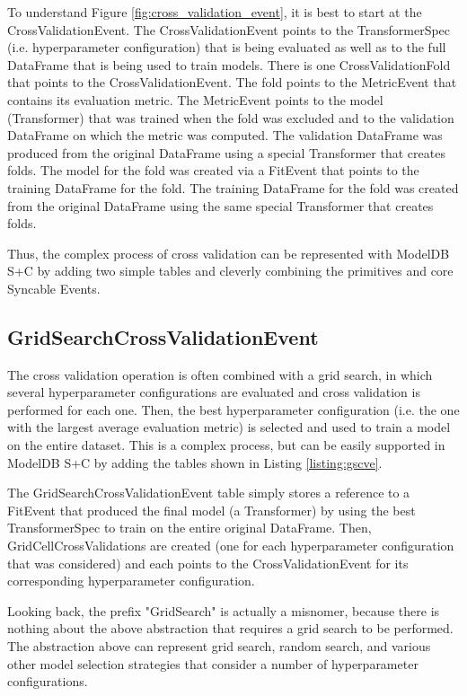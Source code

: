 To understand Figure \ref{fig:cross_validation_event}, it is best to start at the CrossValidationEvent.
The CrossValidationEvent points to the TransformerSpec (i.e. hyperparameter configuration) that is being evaluated
as well as to the full DataFrame that is being used to train models. There is one CrossValidationFold that points to the
CrossValidationEvent. The fold points to the MetricEvent that contains its evaluation metric. The MetricEvent
points to the model (Transformer) that was trained when the fold was excluded and to the validation DataFrame
on which the metric was computed. The validation DataFrame was produced from the original DataFrame using a special
Transformer that creates folds. The model for the fold was created via a FitEvent that points to the training DataFrame
for the fold. The training DataFrame for the fold was created from the original DataFrame using the same special Transformer that
creates folds.

Thus, the complex process of cross validation can be represented with ModelDB S+C by adding two simple tables and cleverly
combining the primitives and core Syncable Events.

\subsection{GridSearchCrossValidationEvent}
The cross validation operation is often combined with a grid search, in which several hyperparameter configurations
are evaluated and cross validation is performed for each one. Then, the best hyperparameter configuration (i.e. the one with the largest
average evaluation metric) is selected and used to train a model on the entire dataset. This is a complex process, but can be easily
supported in ModelDB S+C by adding the tables shown in Listing \ref{listing:gscve}.

The GridSearchCrossValidationEvent table simply stores a reference to a FitEvent
that produced the final model (a Transformer) by using the best TransformerSpec to
train on the entire original DataFrame. Then, GridCellCrossValidations are created
(one for each hyperparameter configuration that was considered) and each points to
the CrossValidationEvent for its corresponding hyperparameter configuration.

Looking back, the prefix "GridSearch" is actually a misnomer, because there is nothing about the
above abstraction that requires a grid search to be performed. The abstraction above
can represent grid search, random search, and various other model selection strategies that
consider a number of hyperparameter configurations.

